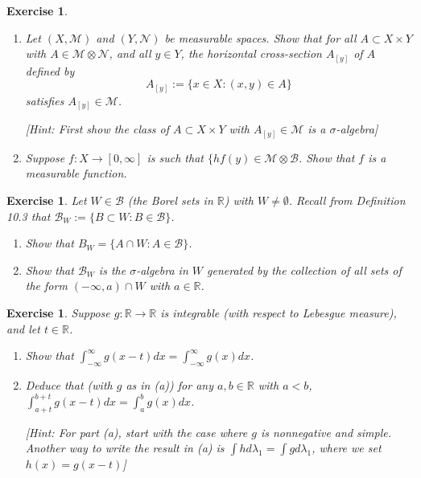\documentclass{article}
\newtheorem{exercise}[theorem]{Exercise}
\begin{document}
\begin{exercise}
\begin{enumerate}
\item[(a)] Let \((X, \mathcal{M})\) and \((Y, \mathcal{N})\) be measurable spaces. Show that for all \( A \subset X \times Y \) with \( A \in \mathcal{M} \otimes \mathcal{N} \), and all \( y \in Y \), the horizontal cross-section \( A_{[y]} \) of \( A \) defined by
    \[
    A_{[y]} := \{x \in X : (x, y) \in A\}
    \]
    satisfies \( A_{[y]} \in \mathcal{M} \). 
    
    [\textit{Hint: First show the class of \( A \subset X \times Y \) with \( A_{[y]} \in \mathcal{M} \) is a \(\sigma\)-algebra}]
    
\item[(b)] Suppose \( f : X \to [0, \infty] \) is such that \( \{h f(y) \in \mathcal{M} \otimes \mathcal{B} \). Show that \( f \) is a measurable function.
\end{enumerate}
\end{exercise}
\begin{exercise}
Let \( W \in \mathcal{B} \) (the Borel sets in \( \mathbb{R} \)) with \( W \neq \emptyset \). Recall from Definition 10.3 that \( \mathcal{B}_W := \{ B \subset W : B \in \mathcal{B} \} \).
\begin{enumerate}
\item[(a)] Show that \( B_W = \{ A \cap W : A \in \mathcal{B} \} \).
    
\item[(b)] Show that \( \mathcal{B}_W \) is the \(\sigma\)-algebra in \( W \) generated by the collection of all sets of the form \( (-\infty, a) \cap W \) with \( a \in \mathbb{R} \).
\end{enumerate}
\end{exercise}
\begin{exercise}
Suppose \( g : \mathbb{R} \to \mathbb{R} \) is integrable (with respect to Lebesgue measure), and let \( t \in \mathbb{R} \).
\begin{enumerate}
\item[(a)] Show that \( \int_{-\infty}^{\infty} g(x - t)dx = \int_{-\infty}^{\infty} g(x)dx \).
    
\item[(b)] Deduce that (with \( g \) as in (a)) for any \( a, b \in \mathbb{R} \) with \( a < b \), \( \int_{a+t}^{b+t} g(x - t)dx = \int_{a}^{b} g(x)dx \).
    
    [\textit{Hint: For part (a), start with the case where \( g \) is nonnegative and simple. Another way to write the result in (a) is \( \int h d\lambda_1 = \int g d\lambda_1 \), where we set \( h(x) = g(x - t) \)}]
\end{enumerate}
\end{exercise}    
\end{document}
